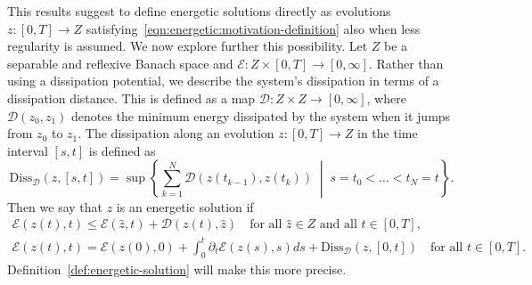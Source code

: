 \documentclass[a4paper,10pt,oneside]{amsbook}
\numberwithin{section}{chapter}
\numberwithin{equation}{chapter}
\theoremstyle{definition}
\begin{document}
This results suggest to define energetic solutions directly as evolutions $z\colon[0,T]\to Z$ satisfying~\eqref{eqn:energetic:motivation-definition} also when less regularity is assumed. We now explore further this possibility. Let $Z$ be a separable and reflexive Banach space and $\mathcal{E}\colon Z\times[0,T]\to[0,\infty]$. Rather than using a dissipation potential, we describe the system's dissipation in terms of a dissipation distance. This is defined as a map $\mathcal D\colon Z\times Z\to[0,\infty]$, where $\mathcal D(z_0,z_1)$ denotes the minimum energy dissipated by the system when it jumps from $z_0$ to $z_1$. The dissipation along an evolution $z\colon[0,T]\to Z$ in the time interval $[s,t]$ is defined as
\[
\text{Diss}_\mathcal{D}(z,[s,t])=\sup\left\{\sum_{k=1}^N\mathcal{D}(z(t_{k-1}),z(t_k))\;\middle|\;s=t_0<\dots<t_N=t\right\}.
\]
Then we say that $z$ is an energetic solution if
\begin{subequations}
\begin{gather}
\mathcal{E}(z(t),t)\le\mathcal{E}(\hat{z},t)+\mathcal{D}(z(t),\hat{z})\quad\text{for all $\hat{z}\in Z$ and all $t\in[0,T]$},\\
\mathcal{E}(z(t),t)=\mathcal{E}(z(0),0)+\int_0^t\partial_t\mathcal{E}(z(s),s)ds+\text{Diss}_\mathcal{D}(z,[0,t])\quad\text{for all $t\in[0,T]$}.
\end{gather}
\end{subequations}
Definition~\ref{def:energetic-solution} will make this more precise.
\end{document}
